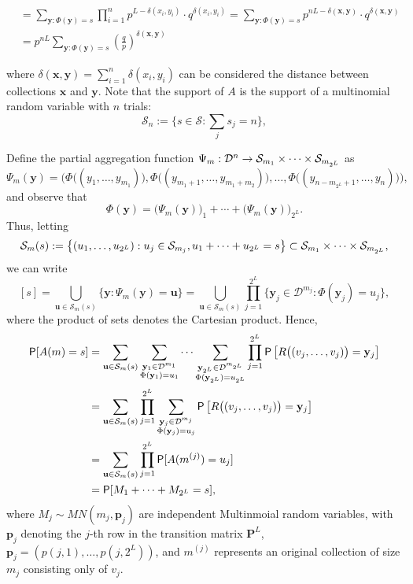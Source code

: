 \documentclass[11pt,draft]{article}
\newcommand{\Dsp}{\mathcal{D}}
\newcommand{\Ssp}{\mathcal{S}}
\newcommand{\xv}{\mathbf{x}}
\newcommand{\yv}{\mathbf{y}}
\newcommand{\pv}{\mathbf{p}}
\newcommand{\Pm}{\mathbf{P}}
\begin{document}
\begin{align}
&= \sum_{\yv:\Phi(\yv) = s} \prod_{i=1}^n p^{L - \delta(x_i,y_i)}\cdot
q^{\delta(x_i,y_i)}
= \sum_{\yv:\Phi(\yv) = s} p^{nL - \delta(\xv,\yv)}\cdot
q^{\delta(\xv,\yv)}  \nonumber \\
&= p^{nL}\sum_{\yv:\Phi(\yv) = s} \left(\frac{q}{p}\right)^{\delta(\xv,\yv)}
\end{align}


where $\delta(\xv,\yv) = \sum_{i=1}^n \delta(x_i,y_i)$ can be considered the distance between collections $\xv$ and $\yv$.
Note that the support of $A$ is the support of a multinomial random variable with $n$ trials: \[\Ssp_n := \bigg\{s \in \Ssp : \sum_j s_j = n \bigg\},\]

Define the partial aggregation function
$\map{\Psi_m}{\Dsp^n}{\Ssp_{m_1} \times \cdots \times \Ssp_{m_{2^L}}}$ as
\[ \Psi_m(\yv)= \Big(\Phi\big((y_1, \dots, y_{m_1})\big),
\Phi\big((y_{m_1 + 1}, \dots, y_{m_1 + m_2})\big),\dots,
\Phi\big((y_{n - m_{2^L} + 1}, \dots, y_{n})\big)\Big), \]
and observe that
\[ \Phi(\yv) = \big(\Psi_m(\yv)\big)_1 + \cdots + \big(\Psi_m(\yv)\big)_{2^L}.
\]
Thus, letting
\[ \Ssp_m(s) := \big\{ (u_1,\dots,u_{2^L}) : u_j \in \Ssp_{m_j},
u_1 + \dots + u_{2^L} = s \big\} \cont
\Ssp_{m_1} \times \cdots \times \Ssp_{m_{2^L}}, \]
we can write
\[ [s] = \bigcup_{\mathbf{u} \in \Ssp_m(s)}
\big\{ \yv : \Psi_m(\yv) = \mathbf{u} \big\} =
\bigcup_{\mathbf{u} \in \Ssp_m(s)} \prod_{j = 1}^{2^L}
\big\{\yv_j \in \Dsp^{m_j}: \Phi(\yv_j) = u_j \big\},
\]
where the product of sets denotes the Cartesian product.
Hence,
\begin{align*}
\P[A(m) = s] &=
\sum_{\mathbf{u} \in \Ssp_m(s)}
\sum_{\substack{\yv_1 \in \Dsp^{m_1}\\ \Phi(\yv_1) = u_1}}\cdots
\sum_{\substack{\yv_{2^L} \in \Dsp^{m_{2^L}}\\ \Phi(\yv_{2^L}) = u_{2^L}}}
\prod_{j = 1}^{2^L} \P\big[R\big((v_j,\dots,v_j)\big) = \yv_j\big] \\
&= \sum_{\mathbf{u} \in \Ssp_m(s)}\prod_{j = 1}^{2^L} 
\sum_{\substack{\yv_j \in \Dsp^{m_j}\\ \Phi(\yv_j) = u_j}}
\P\big[R\big((v_j,\dots,v_j)\big) = \yv_j\big] \\
&= \sum_{\mathbf{u} \in \Ssp_m(s)}\prod_{j = 1}^{2^L} 
\P[A(m^{(j)}) = u_j] \\
&= \P[M_1 + \cdots + M_{2^L} = s],
\end{align*}
where $M_j \sim MN(m_j, \pv_j)$ are independent Multinmoial random variables,
with $\pv_j$ denoting the $j$-th row in the transition matrix
$\Pm^L$, \ie $\pv_j = (p(j,1),\dots,p(j,2^L))$, and $m^{(j)}$ represents an
original collection of size $m_j$ consisting only of $v_j$.
\end{document}
